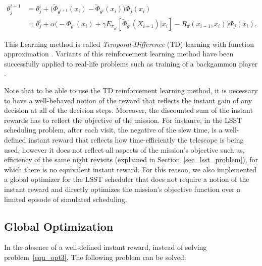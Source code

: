 \documentclass[12pt]{aastex62}
\theoremstyle{definition}
\begin{document}
\begin{equation} \label{equ_TD_update}
\begin{aligned}
\theta_j^{i+1} &= \theta_j^{i} + \Big( \tilde \Phi_{\theta^{i+1}}(x_{{i}})  - \tilde \Phi_{\theta^{i}}(x_{{i}}) \Big)\Phi_j(x_{i})\\
& = \theta_j^{i} + \alpha \Big(-\Phi_{\theta^{i}}(x_{{i}}) + \gamma  E_{\pi_{\theta^i}}[\tilde \Phi_{\theta^{i}}(X_{{i+1}})|x_{{i}}] -R_{\pi}(x_{i-1},x_i)  \Big)\Phi_j(x_{i}).
\end{aligned}
\end{equation}

This Learning method is called \textit{Temporal-Difference} (TD) learning with function approximation \citep{tsitsiklis1997analysis}. Variants of this reinforcement learning method have been successfully applied to real-life problems such as training of a backgammon player \citep{tesauro1995temporal}.


Note that to be able to use the TD reinforcement learning method, it is necessary to have a well-behaved notion of the reward that reflects the instant gain of any decision at all of the decision steps. Moreover, the discounted sum of the instant rewards has to reflect the objective of the mission. For instance, in the LSST scheduling problem, after each visit, the negative of the slew time, is a well-defined instant reward that reflects how time-efficiently the telescope is being used, however it does not reflect all aspects of the mission's objective such as, efficiency of the same night revisits (explained in Section~\ref{sec_lsst_problem}), for which there is no equivalent instant reward. For this reason, we also implemented a global optimizer for the LSST scheduler that does not require a notion of the instant reward and directly optimizes the mission's objective function over a limited  episode of simulated scheduling. 

\subsection{Global Optimization}
In the absence of a well-defined instant reward, instead of solving problem~\ref{equ_opt3}, The following problem can be solved:
\end{document}

